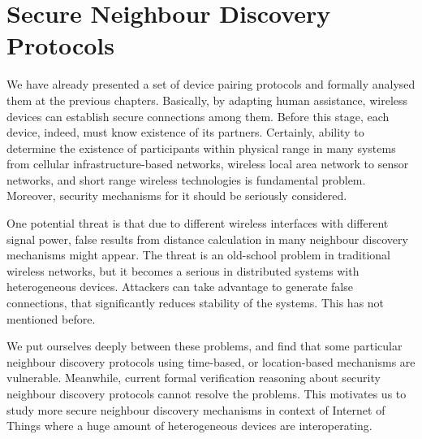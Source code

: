 
\chapter{Secure Neighbour Discovery Protocols} %

\label{Chapter4} %



We have already presented a set of device pairing protocols and formally analysed them at the previous chapters. Basically, by adapting human assistance, wireless devices can establish secure connections among them. Before this stage, each device, indeed, must know existence of its partners. Certainly, ability to determine the existence of participants within physical range in many systems from cellular infrastructure-based networks, wireless local area network to sensor networks, and short range wireless technologies is fundamental problem. Moreover, security mechanisms for it should be seriously considered. 

One potential threat is that due to different wireless interfaces with different signal power, false results from distance calculation in many neighbour discovery mechanisms might appear. The threat is an old-school problem in traditional wireless networks, but it becomes a serious in distributed systems with heterogeneous devices. Attackers can take advantage to generate false connections, that significantly reduces stability of the systems. This has not mentioned before. 

We put ourselves deeply between these problems, and find that some particular neighbour discovery protocols using time-based, or location-based mechanisms are vulnerable. Meanwhile, current formal verification reasoning about security neighbour discovery protocols cannot resolve the problems. This motivates us to study more secure neighbour discovery mechanisms in context of Internet of Things where a huge amount of heterogeneous devices are interoperating. 

